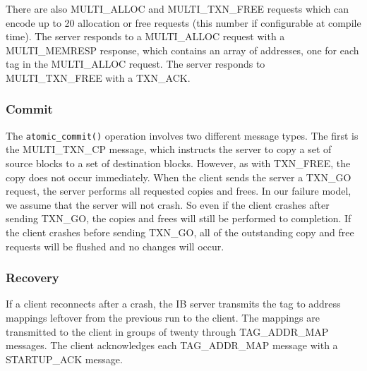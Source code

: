 There are also MULTI\_ALLOC and MULTI\_TXN\_FREE requests which can encode up
to 20 allocation or free requests (this number if configurable at compile time).
The server responds to a MULTI\_ALLOC request with a MULTI\_MEMRESP response,
which contains an array of addresses, one for each tag in the MULTI\_ALLOC
request. The server responds to MULTI\_TXN\_FREE with a TXN\_ACK.

\subsubsection{Commit}

The \texttt{atomic\_commit()} operation involves two different message types.
The first is the MULTI\_TXN\_CP message, which instructs the server to copy
a set of source blocks to a set of destination blocks. However, as with
TXN\_FREE, the copy does not occur immediately. When the client sends the
server a TXN\_GO request, the server performs all requested copies and frees.
In our failure model, we assume that the server will not crash. So even if
the client crashes after sending TXN\_GO, the copies and frees will still be
performed to completion. If the client crashes before sending TXN\_GO, all
of the outstanding copy and free requests will be flushed and no changes will
occur.

\subsubsection{Recovery}

If a client reconnects after a crash, the IB server transmits the tag to
address mappings leftover from the previous run to the client. The mappings
are transmitted to the client in groups of twenty through TAG\_ADDR\_MAP
messages. The client acknowledges each TAG\_ADDR\_MAP message with a
STARTUP\_ACK message.



